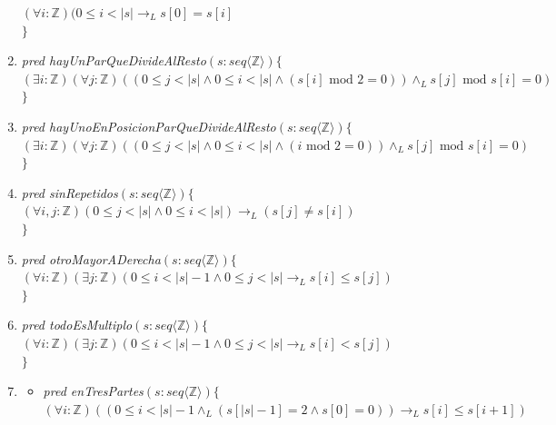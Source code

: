 \documentclass[a4paper]{article}
\begin{document}
\begin{enumerate}[label=\alph*)]
\hspace*{6mm}$(\forall i:\mathbb{Z})(0\leq i<\vert s\vert\rightarrow_L s[0]=s[i]$\\
$\}$
\item \textit{pred hayUnParQueDivideAlResto}$(s: seq\langle \mathbb{Z} \rangle)\{$\\
\hspace*{6mm}$(\exists i:\mathbb{Z})(\forall j:\mathbb{Z})((0\leq j<\vert s\vert \wedge 0\leq i<\vert s\vert \wedge (s[i] \textrm{ mod } 2 =0))\wedge_L s[j] \textrm{ mod } s[i] =0)$\\
$\}$
\item \textit{pred hayUnoEnPosicionParQueDivideAlResto}$(s: seq\langle \mathbb{Z} \rangle)\{$\\
\hspace*{6mm}$(\exists i:\mathbb{Z})(\forall j:\mathbb{Z})((0\leq j<\vert s\vert \wedge 0\leq i<\vert s\vert \wedge (i \textrm{ mod } 2 =0))\wedge_L s[j] \textrm{ mod } s[i] =0)$\\
$\}$
\item \textit{pred sinRepetidos}$(s: seq\langle \mathbb{Z} \rangle)\{$\\
\hspace*{6mm}$(\forall i,j:\mathbb{Z})(0\leq j<\vert s\vert \wedge 0\leq i<\vert s\vert)\rightarrow_L (s[j] \neq s[i])$\\
$\}$
\item \textit{pred otroMayorADerecha}$(s: seq\langle \mathbb{Z} \rangle)\{$\\
\hspace*{6mm}$(\forall i:\mathbb{Z})(\exists j:\mathbb{Z})(0\leq i<\vert s\vert -1 \wedge 0\leq j<\vert s\vert\rightarrow_L s[i]\leq s[j])$\\
$\}$
\item \textit{pred todoEsMultiplo}$(s: seq\langle \mathbb{Z} \rangle)\{$\\
\hspace*{6mm}$(\forall i:\mathbb{Z})(\exists j:\mathbb{Z})(0\leq i<\vert s\vert -1 \wedge 0\leq j<\vert s\vert\rightarrow_L s[i]< s[j])$\\
$\}$
\item 
\begin{itemize}
\item \textit{pred enTresPartes}$(s: seq\langle \mathbb{Z} \rangle)\{$\\
\hspace*{6mm}$(\forall i:\mathbb{Z})((0\leq i<\vert s\vert -1 \wedge_L (s[\vert s \vert -1]=2 \wedge s[0]=0) )\rightarrow_L s[i]\leq s[i+1])$\\

\end{itemize}
\end{enumerate}
\end{document}
